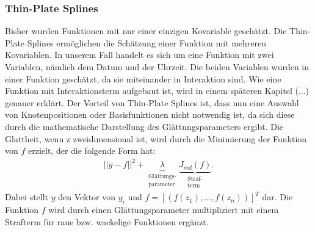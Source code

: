 \documentclass[12pt]{scrreprt}
\begin{document}
\subsubsection{Thin-Plate Splines}
Bisher wurden Funktionen mit nur einer einzigen Kovariable geschätzt. Die Thin-Plate Splines ermöglichen die Schätzung einer Funktion mit mehreren Kovariablen. In unserem Fall handelt es sich um eine Funktion mit zwei Variablen, nämlich dem Datum und der Uhrzeit. Die beiden Variablen wurden in einer Funktion geschätzt, da sie miteinander in Interaktion sind. Wie eine Funktion mit Interaktionsterm aufgebaut ist, wird in einem späteren Kapitel (...) genauer erklärt. Der Vorteil von Thin-Plate Splines ist, dass nun eine Auswahl von Knotenpositionen oder Basisfunktionen nicht notwendig ist, da sich diese durch die mathematische Darstellung des Glättungsparameters ergibt. Die Glattheit, wenn z zweidimensional ist,  wird durch die Minimierung der Funktion von $f$ erzielt, der die folgende Form hat:
\begin{align}
||y-f||^2+\underbrace{\lambda}_{\substack{\text{Glättungs-} \\ \text{parameter}}} \underbrace{J_{md}(f)}_{\substack{\text{Straf-} \\ \text{term}}}.
\end{align}
Dabei stellt $y$ den Vektor von $y_{i}$ und $f=[(f(z_{1}),...,f(z_{n}))]^T$ dar. Die Funktion $f$ wird durch einen Glättungsparameter multipliziert mit einem Strafterm für raue bzw. wackelige Funktionen ergänzt.
\end{document}
